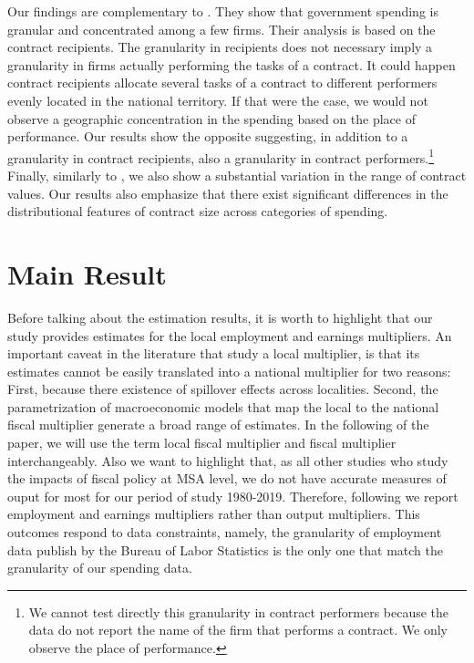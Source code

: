 \documentclass[dv_diss_main.tex]{subfiles}
\begin{document}
Our findings are complementary to \cite{Cox2021}. They show that government spending is granular and concentrated among a few firms. Their analysis is based on the contract recipients. The granularity in recipients does not necessary imply a granularity in firms actually performing the tasks of a contract. It could happen contract recipients allocate several tasks of a contract to different performers evenly located in the national territory. If that were the case, we would not observe a geographic concentration in the spending based on the place of performance. Our results show the opposite suggesting, in addition to a granularity in contract recipients, also a granularity in contract performers.\footnote{We cannot test directly this granularity in contract performers because the data do not report the name of the firm that performs a contract. We only observe the place of performance.} Finally, similarly to \cite{Cox2021}, we also show a substantial variation in the range of contract values. Our results also emphasize that there exist significant differences in the distributional features of contract size across categories of spending.



\section{Main Result}\label{sec:emp_fm}

Before talking about the estimation results, it is worth to highlight that our study provides estimates for the local employment and earnings multipliers. An important caveat in the literature that study a local multiplier, is that its estimates cannot be easily translated into a national multiplier for two reasons: First, because there existence of spillover effects across localities. Second, the parametrization of macroeconomic models that map the local to the national fiscal multiplier generate a broad range of estimates. In the following of the paper, we will use the term local fiscal multiplier and fiscal multiplier interchangeably. Also we want to highlight that, as all other studies who study the impacts of fiscal policy at MSA level, we do not have accurate measures of ouput for most for our period of study 1980-2019. Therefore, following \cte{} we report employment and earnings multipliers rather than output multipliers. This outcomes respond to data constraints, namely, the granularity of employment data publish by the Bureau of Labor Statistics is the only one that match the granularity of our spending data. 
\end{document}
